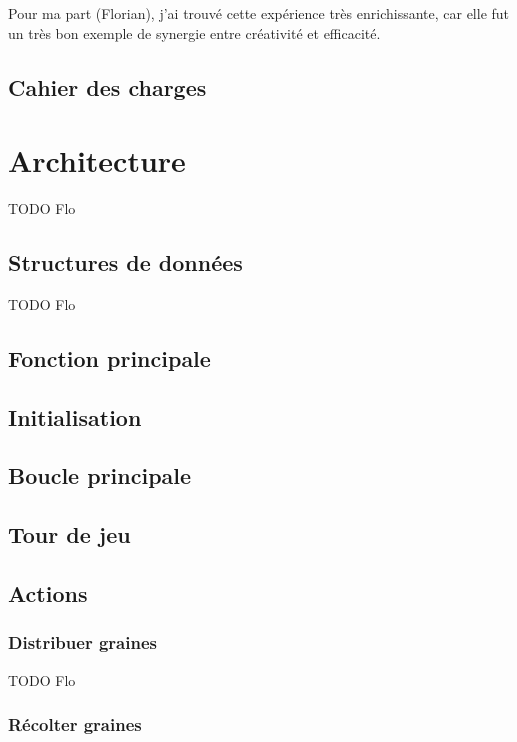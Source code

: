 \documentclass[]{article}
\begin{document}
Pour ma part (Florian), j'ai trouvé cette expérience très enrichissante, car elle fut un très bon exemple de synergie entre créativité et efficacité.

\subsection{Cahier des charges}

\section{Architecture}

TODO Flo

\subsection{Structures de données}

TODO Flo

\subsection{Fonction principale}



\subsection{Initialisation}

\subsection{Boucle principale}

\subsection{Tour de jeu}



\subsection{Actions}

\subsubsection{Distribuer graines}

TODO Flo

\subsubsection{Récolter graines}
\end{document}
